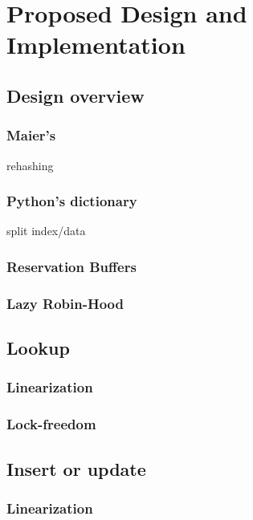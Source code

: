 \chapter{Proposed Design and Implementation}

\cite{cereggii}
\cite{peniocereus-greggii}

\section{Design overview}

\subsection{Maier's}

rehashing

\subsection{Python's dictionary}

split index/data

\subsection{Reservation Buffers}

\subsection{Lazy Robin-Hood}

\cite[CMPXCHG--Compare and Exchange]{x86-64}



\section{Lookup}
\subsection{Linearization}
\subsection{Lock-freedom}

\section{Insert or update}
\subsection{Linearization}
